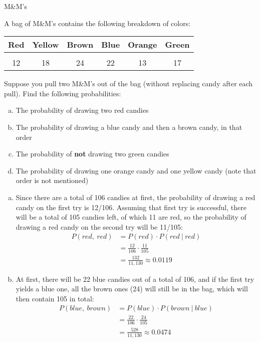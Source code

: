 \begin{example}[https://www.youtube.com/watch?v=7Xe9xjXlC3A]{M\&M's}

A bag of M\&M's contains the following breakdown of colors:

\begin{center}
\begin{tabular}{c c c c c c}
\textbf{Red} & \textbf{Yellow} &  \textbf{Brown} & \textbf{Blue} & \textbf{Orange} & \textbf{Green} \\ \hline
& & & & & \\
12 & 18 & 24 &  22 &  13 & 17 \\
\end{tabular}
\end{center}
Suppose you pull two M\&M's out of the bag (without replacing candy after each pull). Find the following probabilities:
\begin{enumerate}[(a)]
\item The probability of drawing two red candies
\item The probability of drawing a blue candy and then a brown candy, in that order
\item The probability of \textbf{not} drawing two green candies
\item The probability of drawing one orange candy and one yellow candy (note that order is not mentioned)
\end{enumerate}
\pagebreak

\sol
\begin{enumerate}[(a)]
\item Since there are a total of 106 candies at first, the probability of drawing a red candy on the first try is 12/106.  Assuming that first try is successful, there will be a total of 105 candies left, of which 11 are red, so the probability of drawing a red candy on the second try will be 11/105:
\begin{align*}
P(red,\ red) &= P(red) \cdot P(red\ |\ red)\\
&= \frac{12}{106} \cdot \frac{11}{105}\\
&= \boxed{\frac{132}{11,130} \approx 0.0119}
\end{align*}

\item At first, there will be 22 blue candies out of a total of 106, and if the first try yields a blue one, all the brown ones (24) will still be in the bag, which will then contain 105 in total:
\begin{align*}
P(blue,\ brown) &= P(blue) \cdot P(brown \ | \ blue)\\
&= \frac{22}{106} \cdot \frac{24}{105}\\
&= \boxed{\frac{528}{11,130} \approx 0.0474}
\end{align*}


\end{enumerate}
\end{example}
